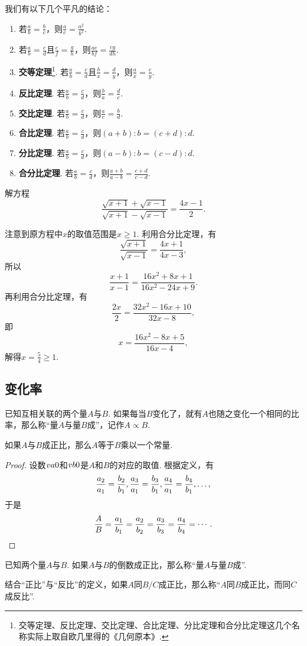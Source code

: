我们有以下几个平凡的结论：\begin{enumerate}
\item 若\(\frac{a}{b} = \frac{b}{c}\)，则\(\frac{a}{c} = \frac{a^2}{b^2}\).
\item 若\(\frac{a}{b} = \frac{c}{d}\)且\(\frac{e}{f} = \frac{g}{h}\)，则\(\frac{ae}{bf} = \frac{cg}{dh}\).
\item {\bf 交等定理}\footnote{%
交等定理、反比定理、交比定理、合比定理、分比定理和合分比定理这几个名称实际上取自欧几里得的《几何原本》.%
}.
若\(\frac{a}{b} = \frac{c}{d}\)且\(\frac{b}{x} = \frac{d}{y}\)，则\(\frac{a}{x} = \frac{c}{y}\).
\item {\bf 反比定理}.
若\(\frac{a}{b} = \frac{c}{d}\)，则\(\frac{b}{a} = \frac{d}{c}\).
\item {\bf 交比定理}.
若\(\frac{a}{b} = \frac{c}{d}\)，则\(\frac{a}{c} = \frac{b}{d}\).
\item {\bf 合比定理}.
若\(\frac{a}{b} = \frac{c}{d}\)，则\((a+b):b = (c+d):d\).
\item {\bf 分比定理}.
若\(\frac{a}{b} = \frac{c}{d}\)，则\((a-b):b = (c-d):d\).
\item {\bf 合分比定理}.
若\(\frac{a}{b} = \frac{c}{d}\)，则\(\frac{a+b}{a-b} = \frac{c+d}{c-d}\).
\end{enumerate}

\begin{example}
解方程\[
\frac{\sqrt{x+1}+\sqrt{x-1}}{\sqrt{x+1}-\sqrt{x-1}} = \frac{4x-1}{2}.
\]
\begin{solution}
注意到原方程中\(x\)的取值范围是\(x\geqslant1\).
利用合分比定理，有\[
\frac{\sqrt{x+1}}{\sqrt{x-1}} = \frac{4x+1}{4x-3},
\]所以\[
\frac{x+1}{x-1} = \frac{16x^2+8x+1}{16x^2-24x+9}.
\]再利用合分比定理，有\[
\frac{2x}{2} = \frac{32x^2-16x+10}{32x-8},
\]即\[
x = \frac{16x^2-8x+5}{16x-4},
\]解得\(x=\frac{5}{4} \geqslant1\).
\end{solution}
\end{example}

\subsection{变化率}
\begin{definition}
已知互相关联的两个量\(A\)与\(B\).
如果每当\(B\)变化了，就有\(A\)也随之变化一个相同的比率，那么称“量\(A\)与量\(B\)成”，记作\(A \propto B\).
\end{definition}

\begin{theorem}
如果\(A\)与\(B\)成正比，那么\(A\)等于\(B\)乘以一个常量.
\begin{proof}
设数\(v{a}{0}\)和\(v{b}{0}\)是\(A\)和\(B\)的对应的取值.
根据定义，有\[
\def\f#1{%
\frac{a_#1}{a_1} = \frac{b_#1}{b_1}%
}
\f2,\f3,\f4,\dotsc,
\]于是\[
\def\f#1{\frac{a_#1}{b_#1}}
\frac{A}{B} = \f1 = \f2 = \f3 = \f4 = \dotsb.
\qedhere
\]
\end{proof}
\end{theorem}

\begin{definition}
已知两个量\(A\)与\(B\).
如果\(A\)与\(B\)的倒数成正比，那么称“量\(A\)与量\(B\)成”.
\end{definition}

结合“正比”与“反比”的定义，如果\(A\)同\(B/C\)成正比，那么称“\(A\)同\(B\)成正比，而同\(C\)成反比”.
